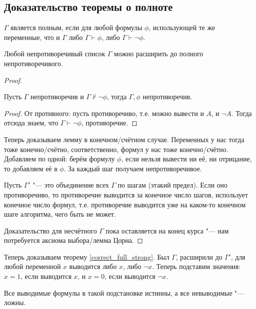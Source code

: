 \subsection{Доказательство теоремы о полноте}
\begin{Def}
	$\Gamma$ является полным, если для любой формулы $\phi$, использующей те же переменные, что и $\Gamma$
	либо $\Gamma \vdash \phi$, либо $\Gamma \vdash \lnot \phi$.
\end{Def}
\begin{lemma}
	Любой непротиворечивый список $\Gamma$ можно расширить до полного непротиворечивого.
\end{lemma}
\begin{proof}
	\begin{assertion}
		Пусть $\Gamma$ непротиворечив и $\Gamma \not \vdash \lnot \phi$, тогда
		$\Gamma, \phi$ непротиворечив.
	\end{assertion}
	\begin{proof}
		От противного: пусть противоречиво, т.е. можно вывести и $A$, и $\lnot A$.
		Тогда отсюда знаем, что $\Gamma \vdash \lnot \phi$, противоречие.
	\end{proof}
	Теперь доказываем лемму в конечном/счётном случае.
	Переменных у нас тогда тоже конечно/счётно, соответственно, формул у нас тоже конечно/счётно.
	Добавляем по одной: берём формулу $\phi$, если нельзя вывести ни её, ни отрицание, то добавляем её в $\phi$.
	За каждый шаг получаем непротиворечивое.

	Пусть $\Gamma'$ "--- это объединение всех $\Gamma$ по шагам (этакий предел).
	Если оно противоречиво, то противоречие выводится за конечное число шагов, использует конечное число формул,
	т.е. противоречие выводится уже на каком-то конечном шаге алгоритма, чего быть не может.

	Доказательство для несчётного $\Gamma$ пока оставляется на конец курса "--- нам потребуется аксиома выбора/лемма Цорна.
\end{proof}
Теперь доказываем теорему \ref{correct_full_strong}.
Был $\Gamma$, расширили до $\Gamma'$, для любой переменной $x$ выводится либо $x$, либо $\lnot x$.
Теперь подставим значения: $x=1$, если выводится $x$, и $x=0$, если выводится $\lnot x$.
\begin{assertion}
	Все выводимые формулы в такой подстановке истинны, а все невыводимые "--- ложны.
\end{assertion}

